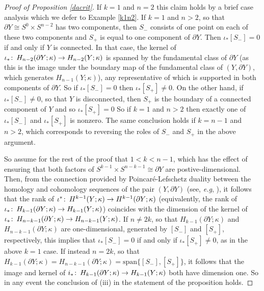 \documentclass[11pt]{amsart}
\theoremstyle{definition}
\theoremstyle{remark}
\numberwithin{equation}{section}
\def\co{\colon\thinspace}
\begin{document}
\begin{proof}[Proof of Proposition \ref{dacrit}]
If $k=1$ and $n=2$ this claim holds by a brief case analysis which we defer to Example \ref{k1n2}.  If $k=1$ and $n>2$, so that $\partial Y\cong S^0\times S^{n-2}$ has two components, then $S_-$ consists of one point on each of these two components and $S_+$ is equal to one component of $\partial Y$.  Then $\iota_*[S_-]=0$ if and only if $Y$ is connected.  In that case, the kernel of $\iota_{*}\co H_{n-2}(\partial Y;\kappa)\to H_{n-2}(Y;\kappa)$ is spanned by the fundamental class of $\partial Y$ (as this is the image under the boundary map of the fundamental class of $(Y,\partial Y)$, which generates $H_{n-1}(Y;\kappa)$), any representative of which is supported in both components of $\partial Y$.  So if $\iota_*[S_-]=0$ then $\iota_*[S_+]\neq 0$.  On the other hand, if $\iota_*[S_-]\neq 0$, so that $Y$ is disconnected, then $S_+$ is the boundary of a connected component of $Y$ and so $\iota_*[S_+]=0$  So if $k=1$ and $n>2$ then exactly one of $\iota_*[S_-]$ and $\iota_*[S_+]$ is nonzero.  The same conclusion holds if $k=n-1$ and $n>2$, which corresponds to reversing the roles of $S_-$ and $S_+$ in the above argument.

So assume for the rest of the proof that $1<k<n-1$, which has the effect of ensuring that both factors of $S^{k-1}\times S^{n-k-1}\cong \partial Y$ are postive-dimensional.  Then, from the connection provided by Poincar\'e-Lefschetz duality between the homology and cohomology sequences of the pair $(Y,\partial Y)$ (see, \emph{e.g}, \cite[Theorem VI.9.2]{Bre}), it follows that the rank of $\iota^*\co H^{k-1}(Y;\kappa)\to H^{k-1}(\partial Y;\kappa)$ (equivalently, the rank of $\iota_*\co H_{k-1}(\partial Y;\kappa)\to H_{k-1}(Y;\kappa)$) coincides with the dimension of the kernel of $\iota_*\co H_{n-k-1}(\partial Y;\kappa)\to H_{n-k-1}(Y;\kappa)$.  If $n\neq 2k$, so that $H_{k-1}(\partial Y;\kappa)$ and $H_{n-k-1}(\partial Y;\kappa)$ are one-dimensional, generated by $[S_-]$ and $[S_+]$, respectively, this implies that $\iota_*[S_-]=0$ if and only if $\iota_*[S_+]\neq 0$, as in the above $k=1$ case.  If instead $n=2k$, so that $H_{k-1}(\partial Y;\kappa)=H_{n-k-1}(\partial Y;\kappa)=\mathrm{span}\{[S_-],[S_+]\}$, it follows that the image and kernel of $i_*\co H_{k-1}(\partial Y;\kappa)\to H_{k-1}(Y;\kappa)$ both have dimension one.  So in any event the conclusion of (iii) in the statement of the proposition holds.     




\end{proof}
\end{document}
